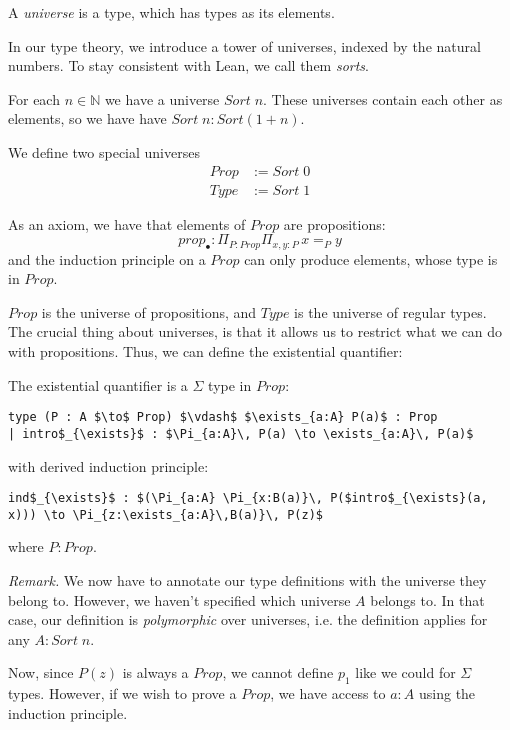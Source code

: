 \documentclass[a4paper, 12pt]{article}
\newcommand{\N}{\mathbb{N}}
\newcommand{\Prop}{\mathit{Prop}}
\newcommand{\Type}{\mathit{Type}}
\newcommand{\Sort}{\mathit{Sort\;}}
\renewcommand{\Prop}{\mathit{Prop}}
\theoremstyle{changedot}
\theoremstyle{changedotbreak}
\theoremstyle{nonumberplain}
\begin{document}
\begin{definition}
  A \textit{universe} is a type, which has types as its elements.
\end{definition}

In our type theory, we introduce a tower of universes, indexed by the natural numbers. To stay consistent with Lean, we call them \textit{sorts}.

\begin{definition}
  For each $n \in \N$ we have a universe $\Sort n$. These universes contain each other as elements, so we have have $\Sort n : Sort(1+n)$.

  We define two special universes
  \begin{align*}
    \Prop &:= \Sort 0\\
    \Type &:= \Sort 1
  \end{align*}

  As an axiom, we have that elements of $\Prop$ are propositions:
  \[prop_{\bullet} : \Pi_{P:\Prop}\Pi_{x, y:P}\, x=_{P}y\]
  and the induction principle on a $\Prop$ can only produce elements, whose type is in $\Prop$.
\end{definition}

$\Prop$ is the universe of propositions, and $\Type$ is the universe of regular types. The crucial thing about universes, is that it allows us to restrict what we can do with propositions. Thus, we can define the existential quantifier:

\begin{definition}
  The existential quantifier is a $\Sigma$ type in $\Prop$:
\begin{lstlisting}
type (P : A $\to$ Prop) $\vdash$ $\exists_{a:A} P(a)$ : Prop
| intro$_{\exists}$ : $\Pi_{a:A}\, P(a) \to \exists_{a:A}\, P(a)$
\end{lstlisting}
  with derived induction principle:
\begin{lstlisting}
ind$_{\exists}$ : $(\Pi_{a:A} \Pi_{x:B(a)}\, P($intro$_{\exists}(a, x))) \to \Pi_{z:\exists_{a:A}\,B(a)}\, P(z)$
\end{lstlisting}
  where $P : \Prop$. 
\end{definition}
\textit{Remark.} We now have to annotate our type definitions with the universe they belong to. However, we haven't specified which universe $A$ belongs to. In that case, our definition is \textit{polymorphic} over universes, i.e. the definition applies for any $A : \Sort n$.

Now, since $P(z)$ is always a $\Prop$, we cannot define $p_{1}$ like we could for $\Sigma$ types. However, if we wish to prove a $\Prop$, we have access to $a:A$ using the induction principle.
\end{document}

